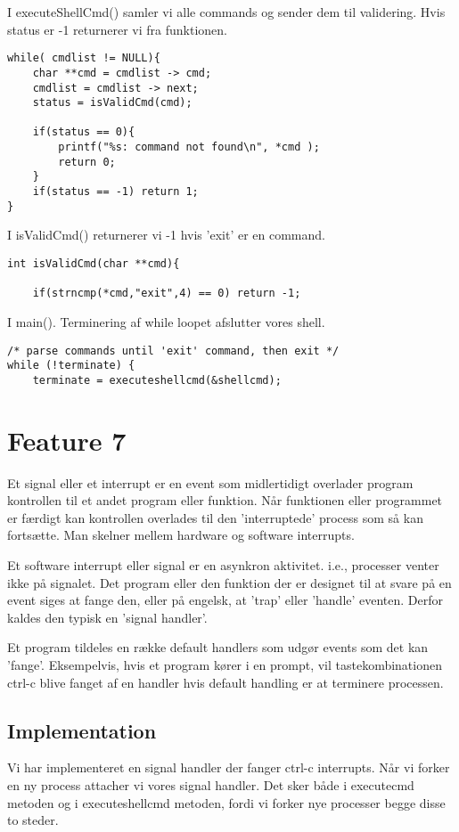 \documentclass[danish]{report}
\begin{document}
I executeShellCmd() samler vi alle commands og sender dem til validering. Hvis status er -1 returnerer vi fra funktionen.




\begin{lstlisting}
while( cmdlist != NULL){
	char **cmd = cmdlist -> cmd;
	cmdlist = cmdlist -> next;
	status = isValidCmd(cmd);

	if(status == 0){ 
		printf("%s: command not found\n", *cmd );
		return 0;
	}
	if(status == -1) return 1;
}
\end{lstlisting}

I isValidCmd() returnerer vi -1 hvis 'exit' er en command.
\begin{lstlisting}
int isValidCmd(char **cmd){
	
	if(strncmp(*cmd,"exit",4) == 0) return -1;
\end{lstlisting}

I main(). Terminering af while loopet afslutter vores shell. 
\begin{lstlisting}
/* parse commands until 'exit' command, then exit */
while (!terminate) {
	terminate = executeshellcmd(&shellcmd);
\end{lstlisting}

\section{Feature 7}

Et signal eller et interrupt er en event som midlertidigt overlader program kontrollen til et andet program eller funktion. Når funktionen eller programmet er færdigt kan kontrollen overlades til den 'interruptede' process som så kan fortsætte. Man skelner mellem hardware og software interrupts.

Et software interrupt eller signal er en asynkron aktivitet. i.e., processer venter ikke på signalet. Det program eller den funktion der er designet til at svare på en event siges at fange den, eller på engelsk,  at 'trap' eller 'handle' eventen. Derfor kaldes den typisk en 'signal handler'. 

Et program tildeles en række default handlers som udgør events som det kan 'fange'. Eksempelvis, hvis et program kører i en prompt, vil tastekombinationen ctrl-c blive fanget af en handler hvis default handling er at terminere processen. 

\subsection{Implementation}
Vi har implementeret en signal handler der fanger ctrl-c interrupts. Når vi forker en ny process attacher vi vores signal handler. Det sker både i executecmd metoden og i executeshellcmd metoden, fordi vi forker nye processer begge disse to steder. 
\end{document}
